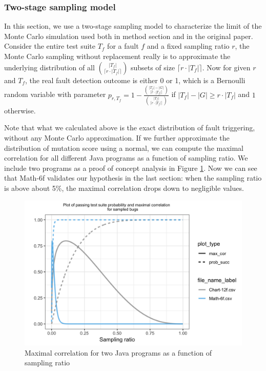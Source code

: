 \documentclass[10pt,letterpaper]{article}
\begin{document}
\subsubsection{Two-stage sampling model}

In this section, we use a two-stage sampling model to characterize the limit of the Monte Carlo simulation used both in method section and in the original paper. Consider the entire test suite $T_f$ for a fault $f$ and a fixed sampling  ratio $r$, the Monte Carlo sampling without replacement really is to approximate the underlying distribution of all ${|T_f|\choose \lceil r\cdot |T_f| \rceil }$ subsets of size  $\lceil r\cdot |T_f| \rceil$. Now for given $r$ and $T_f$, the real fault detection outcome is either 0 or 1, which is a Bernoulli random variable with parameter $p_{r,T_f} = 1- \frac{{|T_f|-|G|\choose \lceil r\cdot |T_f| \rceil }}{{|T_f|\choose \lceil r\cdot |T_f| \rceil }}$ if $|T_f|-|G|\geq r\cdot |T_f|$ and $1$ otherwise.

Note that what we calculated above is the exact distribution of fault triggering, without any Monte Carlo approximation. If we further approximate the distribution of mutation score using a normal, we can compute the maximal correlation for all different Java programs as a function of sampling ratio. We include two programs as a proof of concept analysis in Figure  \ref{fig:maximal_cor_2_program}. Now we can see that Math-6f validates our hypothesis in the last section: when the sampling ratio is above about 5\%, the maximal correlation drops down to negligible values. 

  \begin{figure}[ht!]
        \centering
        \includegraphics[scale=0.15]{figures/sampled_prob.png}
        \caption{Maximal correlation for two Java programs as a function of sampling ratio}
        \label{fig:maximal_cor_2_program}
    \end{figure}
\end{document}
